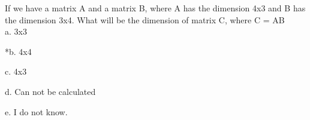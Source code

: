 
If we have a matrix A and a matrix B, where A has the dimension 4x3 and B has the dimension 3x4. What will be the dimension of matrix C,
where C = AB\\

a. 3x3

*b. 4x4

c. 4x3

d. Can not be calculated

e. I do not know.\\
